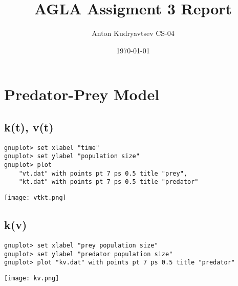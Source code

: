 \documentclass{article}
\title{AGLA Assigment 3 Report}
\author{Anton Kudryavtsev CS-04}
\date{\today}
\begin{document}
\maketitle

\section*{Predator-Prey Model}
\graphicspath{ {./} }
\subsection*{k(t), v(t)}
\begin{lstlisting}
gnuplot> set xlabel "time"
gnuplot> set ylabel "population size"
gnuplot> plot
    "vt.dat" with points pt 7 ps 0.5 title "prey",
    "kt.dat" with points pt 7 ps 0.5 title "predator"
\end{lstlisting}
\texttt{[image: vtkt.png]}
\subsection*{k(v)}
\begin{lstlisting}
gnuplot> set xlabel "prey population size"
gnuplot> set ylabel "predator population size"
gnuplot> plot "kv.dat" with points pt 7 ps 0.5 title "predator"
\end{lstlisting}
\texttt{[image: kv.png]}
\end{document}

